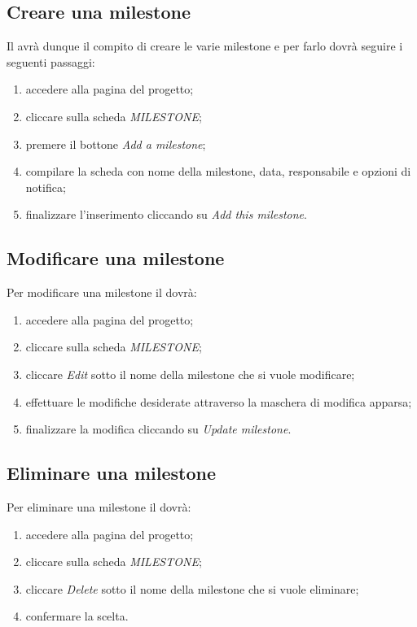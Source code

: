 		\subsection{Creare una milestone}
			Il  avrà dunque il compito di creare le varie milestone e per farlo dovrà seguire i seguenti passaggi:
			\begin{enumerate}
				\item accedere alla pagina del progetto;
				\item cliccare sulla scheda \textit{MILESTONE};
				\item premere il bottone \textit{Add a milestone};
				\item compilare la scheda con nome della milestone, data, responsabile e opzioni di notifica;
				\item finalizzare l'inserimento cliccando su \textit{Add this milestone}.
			\end{enumerate}
			
		\subsection{Modificare una milestone}
			Per modificare una milestone il  dovrà:
			\begin{enumerate}
				\item accedere alla pagina del progetto;
				\item cliccare sulla scheda \textit{MILESTONE};
				\item cliccare \textit{Edit} sotto il nome della milestone che si vuole modificare;
				\item effettuare le modifiche desiderate attraverso la maschera di modifica apparsa;
				\item finalizzare la modifica cliccando su \textit{Update milestone}.
			\end{enumerate}
			
		\subsection{Eliminare una milestone}
			Per eliminare una milestone il  dovrà:
			\begin{enumerate}
				\item accedere alla pagina del progetto;
				\item cliccare sulla scheda \textit{MILESTONE};
				\item cliccare \textit{Delete} sotto il nome della milestone che si vuole eliminare;
				\item confermare la scelta.
			\end{enumerate}
			
